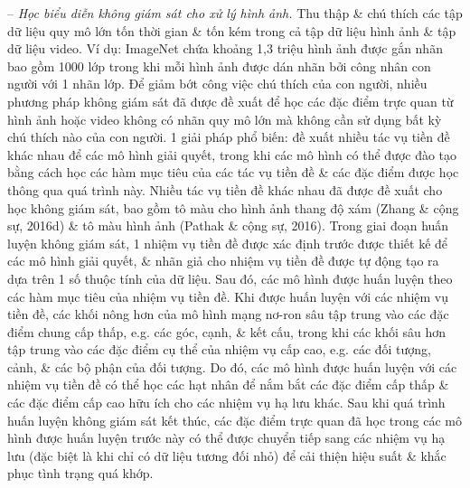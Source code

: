 \documentclass{article}
\begin{document}
\begin{itemize}
\begin{itemize}
\begin{itemize}
            -- {\it Học biểu diễn không giám sát cho xử lý hình ảnh.} Thu thập \& chú thích các tập dữ liệu quy mô lớn tốn thời gian \& tốn kém trong cả tập dữ liệu hình ảnh \& tập dữ liệu video. Ví dụ: ImageNet chứa khoảng 1,3 triệu hình ảnh được gắn nhãn bao gồm 1000 lớp trong khi mỗi hình ảnh được dán nhãn bởi công nhân con người với 1 nhãn lớp. Để giảm bớt công việc chú thích của con người, nhiều phương pháp không giám sát đã được đề xuất để học các đặc điểm trực quan từ hình ảnh hoặc video không có nhãn quy mô lớn mà không cần sử dụng bất kỳ chú thích nào của con người. 1 giải pháp phổ biến: đề xuất nhiều tác vụ tiền đề khác nhau để các mô hình giải quyết, trong khi các mô hình có thể được đào tạo bằng cách học các hàm mục tiêu của các tác vụ tiền đề \& các đặc điểm được học thông qua quá trình này. Nhiều tác vụ tiền đề khác nhau đã được đề xuất cho học không giám sát, bao gồm tô màu cho hình ảnh thang độ xám (Zhang \& cộng sự, 2016d) \& tô màu hình ảnh (Pathak \& cộng sự, 2016). Trong giai đoạn huấn luyện không giám sát, 1 nhiệm vụ tiền đề được xác định trước được thiết kế để các mô hình giải quyết, \& nhãn giả cho nhiệm vụ tiền đề được tự động tạo ra dựa trên 1 số thuộc tính của dữ liệu. Sau đó, các mô hình được huấn luyện theo các hàm mục tiêu của nhiệm vụ tiền đề. Khi được huấn luyện với các nhiệm vụ tiền đề, các khối nông hơn của mô hình mạng nơ-ron sâu tập trung vào các đặc điểm chung cấp thấp, e.g. các góc, cạnh, \& kết cấu, trong khi các khối sâu hơn tập trung vào các đặc điểm cụ thể của nhiệm vụ cấp cao, e.g. các đối tượng, cảnh, \& các bộ phận của đối tượng. Do đó, các mô hình được huấn luyện với các nhiệm vụ tiền đề có thể học các hạt nhân để nắm bắt các đặc điểm cấp thấp \& các đặc điểm cấp cao hữu ích cho các nhiệm vụ hạ lưu khác. Sau khi quá trình huấn luyện không giám sát kết thúc, các đặc điểm trực quan đã học trong các mô hình được huấn luyện trước này có thể được chuyển tiếp sang các nhiệm vụ hạ lưu (đặc biệt là khi chỉ có dữ liệu tương đối nhỏ) để cải thiện hiệu suất \& khắc phục tình trạng quá khớp.


\end{itemize}
\end{itemize}
\end{itemize}
\end{document}
